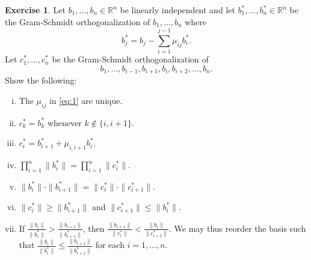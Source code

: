 \documentclass[12pt,a4paper]{article}
\theoremstyle{plain}
\newtheorem*{Sol*}{Solution}
\theoremstyle{definition}
\newtheorem{Ex}{Exercise}
\newif\ifsolutions
\newcommand{\exercise}[2]{
			\begin{Ex} #1 \end{Ex}
			\ifsolutions  \begin{Sol*} #2 \end{Sol*} \bigskip \else \bigskip  \fi
		}
\begin{document}
\exercise{Let $b_1,\dots,b_n ∈ℝ^n$ be linearly independent  and let $b_1^*,\dots,b_n^* ∈ ℝ^n$ be the Gram-Schmidt orthogonalization of $b_1,\dots,b_n$ where
  \begin{equation}
    \label{eq:1}
    b_j^* = b_j - ∑_{i=1}^{j-1}μ_{ij} b_i^*. 
  \end{equation}
  Let $c_1^*,\dots,c_n^*$ be the Gram-Schmidt orthogonalization of
  \begin{displaymath}
    b_1,\dots,b_{i-1},b_{i+1},b_i,b_{i+2},\dots,b_n.
  \end{displaymath}
  Show the following:
  \begin{enumerate}[i)]
  \item The $μ_{ij}$ in \eqref{eq:1} are unique.
  \item $c_k^* = b_k^*$ whenever $k ∉\{i,i+1\}$.
  \item $c_i^* = b_{i+1}^* + μ_{i,i+1} b_i^*$.
  \item $∏_{i=1}^n \|b_i^*\| = ∏_{i=1}^n \|c_i^*\|$. 
  \item $\|b_i^*\| ⋅\|b_{i+1}^*\| = \|c_i^*\| ⋅\|c_{i+1}^*\|$.
	\item $\| c_i^* \| \geq \| b_{i+1}^* \|$ and $\| c_{i+1}^* \| \leq \| b_{i}^* \|$.
	\item If $\frac{\| b_i \|}{\| b_i^* \|} > \frac{\| b_{i+1} \|}{\| b_{i+1}^* \|}$, then  $\frac{\| b_{i+1} \|}{\| c_i^* \|} < \frac{\| b_{i} \|}{\| c_{i+1}^* \|}$.
	We may thus reorder the basis such that $\frac{\| b_i \|}{\| b_i^* \|} \leq \frac{\| b_{i+1} \|}{\| b_{i+1}^* \|}$ for each $i=1, \dots, n$.
  \end{enumerate}

  }{
	The norms below are the $l^2$ norm unless specifed otherwise.
	\begin{enumerate}[i)]
		\item The coefficients of $\mu_{ij}$ of \eqref{eq:1} are that of the projection of $b_j$ onto the space ${\rm span}\{ b_1^*, \dots, b_{j-1}^* \}$. Note that this defines $b_j - b_j^*$ and hence $b_j^*$. 

		\item Clearly $c_k^* = b_k^*$ for $k < i$. For $k>i+1$, one defines $c_k - c_k^*$ by projecting $c_k$ onto ${\rm span}\{ c_1^*, \dots, c_{k-1}^* \}$. 
		By the definition of the $c_i$ and properties of the Gram-Schmidt orthogonalization, $b_k - c_k^*$ is the projection of $b_k$ onto ${\rm span}\{ b_1^*, \dots, b_{k-1}^* \}$.
		Therefore $c_k^* = b_k^*$ since they are defined in the same fashion.

		\item Note that the vector
			\[ v = b_{i+1}^* + μ_{i,i+1} b_i^* \]
		verifies that $v \perp b_1^*, \dots, v \perp b_{i-1}^*$.
		Furthermore, one has
			\[ (b_{i+1} - v)^T b_{k}^* = 0 \]
		for each $k = i, i+2, i+3, \dots, n$ (note that only $k=i$ requires computation).


\end{enumerate}}
\end{document}

